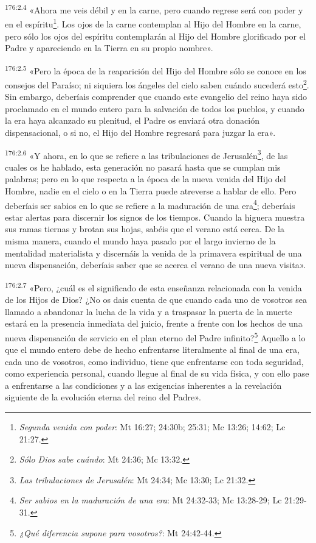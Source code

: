 \par 
\textsuperscript{176:2.4} «Ahora me veis débil y en la carne, pero cuando regrese será con poder y en el espíritu\footnote{\textit{Segunda venida con poder}: Mt 16:27; 24:30b; 25:31; Mc 13:26; 14:62; Lc 21:27.}. Los ojos de la carne contemplan al Hijo del Hombre en la carne, pero sólo los ojos del espíritu contemplarán al Hijo del Hombre glorificado por el Padre y apareciendo en la Tierra en su propio nombre».

\par 
\textsuperscript{176:2.5} «Pero la época de la reaparición del Hijo del Hombre sólo se conoce en los consejos del Paraíso; ni siquiera los ángeles del cielo saben cuándo sucederá esto\footnote{\textit{Sólo Dios sabe cuándo}: Mt 24:36; Mc 13:32.}. Sin embargo, deberíais comprender que cuando este evangelio del reino haya sido proclamado en el mundo entero para la salvación de todos los pueblos, y cuando la era haya alcanzado su plenitud, el Padre os enviará otra donación dispensacional, o si no, el Hijo del Hombre regresará para juzgar la era».

\par 
\textsuperscript{176:2.6} «Y ahora, en lo que se refiere a las tribulaciones de Jerusalén\footnote{\textit{Las tribulaciones de Jerusalén}: Mt 24:34; Mc 13:30; Lc 21:32.}, de las cuales os he hablado, esta generación no pasará hasta que se cumplan mis palabras; pero en lo que respecta a la época de la nueva venida del Hijo del Hombre, nadie en el cielo o en la Tierra puede atreverse a hablar de ello. Pero deberíais ser sabios en lo que se refiere a la maduración de una era\footnote{\textit{Ser sabios en la maduración de una era}: Mt 24:32-33; Mc 13:28-29; Lc 21:29-31.}; deberíais estar alertas para discernir los signos de los tiempos. Cuando la higuera muestra sus ramas tiernas y brotan sus hojas, sabéis que el verano está cerca. De la misma manera, cuando el mundo haya pasado por el largo invierno de la mentalidad materialista y discernáis la venida de la primavera espiritual de una nueva dispensación, deberíais saber que se acerca el verano de una nueva visita».

\par 
\textsuperscript{176:2.7} «Pero, ¿cuál es el significado de esta enseñanza relacionada con la venida de los Hijos de Dios? ¿No os dais cuenta de que cuando cada uno de vosotros sea llamado a abandonar la lucha de la vida y a traspasar la puerta de la muerte estará en la presencia inmediata del juicio, frente a frente con los hechos de una nueva dispensación de servicio en el plan eterno del Padre infinito?\footnote{\textit{¿Qué diferencia supone para vosotros?}: Mt 24:42-44.} Aquello a lo que el mundo entero debe de hecho enfrentarse literalmente al final de una era, cada uno de vosotros, como individuo, tiene que enfrentarse con toda seguridad, como experiencia personal, cuando llegue al final de su vida física, y con ello pase a enfrentarse a las condiciones y a las exigencias inherentes a la revelación siguiente de la evolución eterna del reino del Padre».

